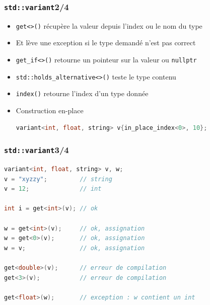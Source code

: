 \documentclass[C++.tex]{subfiles}
\begin{document}
\begin{frame}[fragile]
	\frametitle{\lstinline|std::variant|\titlehfill{}2/4}
	\begin{itemize}
		\item \lstinline|get<>()| récupère la valeur depuis l'index ou le nom du type
		\item Et lève une exception si le type demandé n'est pas correct
		\item \lstinline|get_if<>()| retourne un pointeur sur la valeur ou \lstinline|nullptr|
		\item \lstinline|std::holds_alternative<>()| teste le type contenu
		\item \lstinline|index()| retourne l'index d'un type donnée
		\item Construction en-place
		
		\begin{lstlisting}[language=C++]
variant<int, float, string> v{in_place_index<0>, 10};\end{lstlisting}
		

	\end{itemize}
\end{frame}

\begin{frame}[fragile]
	\frametitle{\lstinline|std::variant|\titlehfill{}3/4}
	\begin{lstlisting}[language=C++]
variant<int, float, string> v, w;
v = "xyzzy";         // string
v = 12;              // int

int i = get<int>(v); // ok

w = get<int>(v);     // ok, assignation
w = get<0>(v);       // ok, assignation
w = v;               // ok, assignation

get<double>(v);      // erreur de compilation
get<3>(v);           // erreur de compilation

get<float>(w);       // exception : w contient un int\end{lstlisting}
\end{frame}
\end{document}
